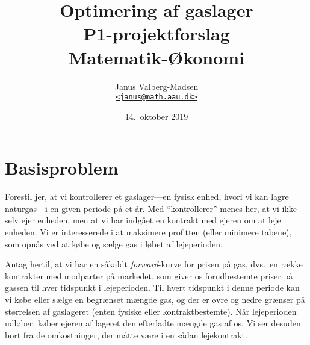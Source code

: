\documentclass[12pt,a4paper,oneside,final]{article}
\title{
  Optimering af gaslager\\
  \large P1-projektforslag \\
  Matematik-{\O}konomi
}
\author{
  Janus Valberg-Madsen\\
  \href{mailto:janus@math.aau.dk}{\texttt{<janus@math.aau.dk>}}
}
\date{14.\ oktober 2019}
\begin{document}
\maketitle
\begin{center}
\end{center}
\tableofcontents


\clearpage
\section{Basisproblem}
Forestil jer, at vi kontrollerer et gaslager---en fysisk enhed, hvori vi kan lagre naturgas---i en given periode på et år.
Med ``kontrollerer'' menes her, at vi ikke selv ejer enheden, men at vi har indgået en kontrakt med ejeren om at leje enheden.
Vi er interesserede i at maksimere profitten (eller minimere tabene), som opnås ved at købe og sælge gas i løbet af lejeperioden.

Antag hertil, at vi har en såkaldt \emph{forward}-kurve for prisen på gas, dvs.\ en række kontrakter med modparter på markedet, som giver os forudbestemte priser på gassen til hver tidspunkt i lejeperioden.
Til hvert tidspunkt i denne periode kan vi købe eller sælge en begrænset mængde gas, og der er øvre og nedre grænser på størrelsen af gaslageret (enten fysiske eller kontraktbestemte).
Når lejeperioden udløber, køber ejeren af lageret den efterladte mængde gas af os.
Vi ser desuden bort fra de omkostninger, der måtte være i en sådan lejekontrakt.
\end{document}
